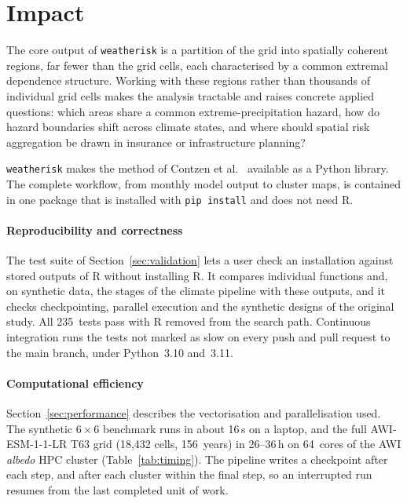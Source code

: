 \documentclass[preprint,12pt,a4paper]{elsarticle}
\newcommand{\rev}[1]{{#1}}
\newcommand{\revg}[1]{{#1}}
\newcommand{\revo}[1]{{#1}}
\begin{document}
\FloatBarrier

\section{Impact}
\label{sec:impact}

\revg{The core output of \texttt{weatherisk} is a partition of the
grid into spatially coherent regions, far fewer than the grid cells, each characterised by a common extremal
dependence structure. Working with these regions rather than
thousands of individual grid cells makes the analysis tractable and
raises concrete applied questions: which areas share a common
extreme-precipitation hazard, how do hazard boundaries shift across
climate states, and where should spatial risk aggregation be drawn
in insurance or infrastructure planning?}

\revo{\texttt{weatherisk} makes the method of Contzen
et al.~\cite{contzen2025} available as a Python library. The complete workflow, from monthly
model output to cluster maps, is contained in one package that is
installed with \texttt{pip install} and does not need R.}

\rev{\paragraph{Reproducibility and correctness}
The test suite of Section~\ref{sec:validation} lets a user check
an installation against stored outputs of R without installing R. It
compares individual functions and, on synthetic data, the stages of
the climate pipeline with these outputs, and it checks
checkpointing, parallel execution and the synthetic designs of the
original study. All 235~tests pass with R removed from the search
path.
Continuous integration runs the tests not marked as slow on every
push and pull request to the main branch, under Python~3.10 and~3.11.}

\paragraph{Computational efficiency}
Section~\ref{sec:performance} describes the vectorisation and
parallelisation used. The synthetic $6{\times}6$ benchmark runs in about 16\,s on a
laptop, and the full AWI-ESM-1-1-LR T63 grid (18{,}432 cells,
156~years) in 26--36\,h on 64~cores of the AWI \emph{albedo} HPC
cluster (Table~\ref{tab:timing}). The pipeline writes a checkpoint
after each step, and after each cluster within the final step, so an
interrupted run resumes from the last completed unit of work.
\end{document}
